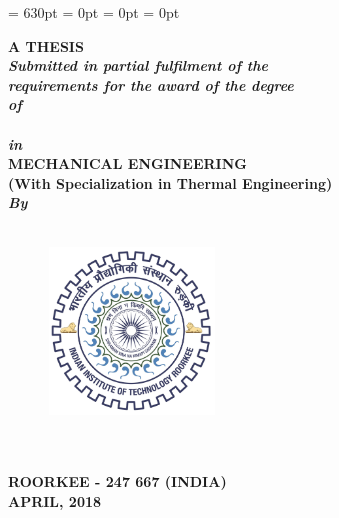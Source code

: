 \begin{titlepage}
\renewcommand{\baselinestretch}{1.5}
  \setlength{\parindent}{0pt}
\textheight = 630pt \topmargin=0pt \voffset=1cm \headheight = 0pt
\marginparwidth= 0pt \headsep = 0pt
\pagestyle{empty}

\begin{center}
\renewcommand{\baselinestretch}{1.2}
\thispagestyle{empty}
\vspace{-10pt}

{\Large \bfseries {\ttitle}\par}\vspace{0.4cm} %

\vspace{0.8cm}
\begingroup
    \fontsize{12pt}{12pt} \selectfont
    \bfseries
\vspace{0.5cm}    
{\large\textbf{A THESIS}} \\
\vspace{0.5cm}
{
{\emph{\emph{\textbf{\textit{Submitted in partial fulfilment of
the \\ requirements for
the award of the degree \\\vspace{0.5cm}
of}}}}\\\vspace{0.5cm}
{\normalsize\textbf{\degreename}}}\\\vspace{0.5cm}
\emph{\emph{\textbf{\textit{in}}}} \\\vspace{0.5cm}
{\normalsize\textbf{MECHANICAL ENGINEERING}}}\\
{\small\textbf {\textsf{(With Specialization in Thermal Engineering)}}} \\
\vspace{1cm}
{\emph {\emph{\textbf{\textit{By}}}}} \\\vspace{0.5cm}
{\normalsize\textbf{\authorname}}\\
\endgroup

\vspace{0.8cm}
\begin{figure}[h]
  \centering
  \includegraphics[width=1.75in, height=1.75in]{formalities/logo.jpg}
\end{figure}
\renewcommand{\baselinestretch}{1.2}
\vspace{1.0cm}
\begingroup
    \fontsize{14pt}{12pt} \selectfont
    \bfseries
\deptname\\
\univname\\
ROORKEE - 247 667 (INDIA)\\
APRIL, 2018  
\endgroup
\end{center}

\end{titlepage}